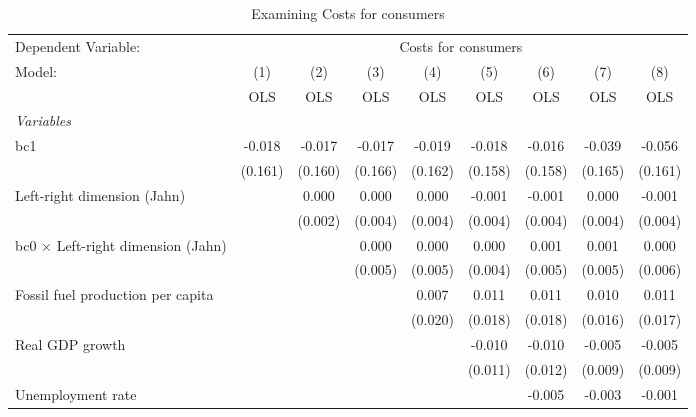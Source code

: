 
\begin{table}[htbp]
   \caption{Examining Costs for consumers}
   \centering
   \begin{tabular}{lcccccccc}
      \toprule
      Dependent Variable: & \multicolumn{8}{c}{Costs for consumers}\\
      Model:                                    & (1)     & (2)     & (3)     & (4)     & (5)     & (6)     & (7)     & (8)\\  
                                                &  OLS    & OLS     & OLS     & OLS     & OLS     & OLS     & OLS     & OLS\\  
      \midrule
      \emph{Variables}\\
      bc1                                       & -0.018  & -0.017  & -0.017  & -0.019  & -0.018  & -0.016  & -0.039  & -0.056\\   
                                                & (0.161) & (0.160) & (0.166) & (0.162) & (0.158) & (0.158) & (0.165) & (0.161)\\   
      Left-right dimension (Jahn)               &         & 0.000   & 0.000   & 0.000   & -0.001  & -0.001  & 0.000   & -0.001\\   
                                                &         & (0.002) & (0.004) & (0.004) & (0.004) & (0.004) & (0.004) & (0.004)\\   
      bc0 $\times$ Left-right dimension (Jahn)  &         &         & 0.000   & 0.000   & 0.000   & 0.001   & 0.001   & 0.000\\   
                                                &         &         & (0.005) & (0.005) & (0.004) & (0.005) & (0.005) & (0.006)\\   
      Fossil fuel production per capita         &         &         &         & 0.007   & 0.011   & 0.011   & 0.010   & 0.011\\   
                                                &         &         &         & (0.020) & (0.018) & (0.018) & (0.016) & (0.017)\\   
      Real GDP growth                           &         &         &         &         & -0.010  & -0.010  & -0.005  & -0.005\\   
                                                &         &         &         &         & (0.011) & (0.012) & (0.009) & (0.009)\\   
      Unemployment rate                         &         &         &         &         &         & -0.005  & -0.003  & -0.001\\   

\end{tabular}
\end{table}
